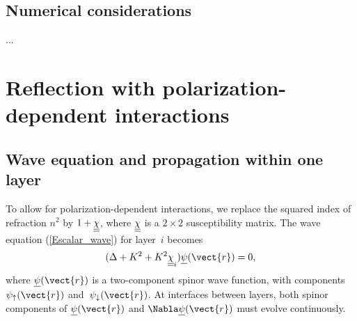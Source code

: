 \subsection{Numerical considerations}

...



\section{Reflection with polarization-dependent interactions}\label{s:pol}


\subsection{Wave equation and propagation within one layer}

To allow for polarization-dependent interactions,
we replace the squared index of refraction $n^2$
by $1+\underline{\underline{\chi}}$, where $\underline{\underline{\chi}}$ is a $2\times 2$ susceptibility matrix.
The wave equation (\ref{Escalar_wave}) for layer~$i$ becomes
\begin{equation}\label{Ewaveqp}  
(\Delta +K^2 +K^2 \uu\chi_i) \u\psi(\vect{r})= 0,
\end{equation}
where $\u\psi(\vect{r})$ is a two-component spinor wave function,
with components $\psi_\t(\vect{r})$ and~$\psi_\d(\vect{r})$.
At interfaces between layers,
both spinor components of $\u\psi(\vect{r})$ and $\Nabla\u\psi(\vect{r})$
must evolve continuously.

